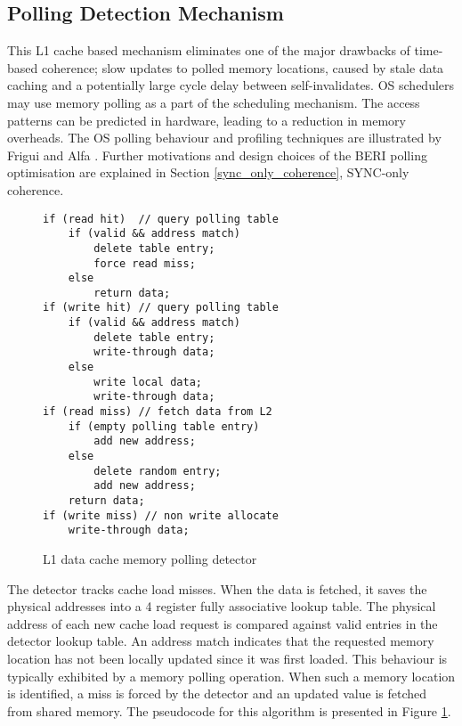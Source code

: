 	\subsection{Polling Detection Mechanism}
		\label{polling_detection_mechanism}
		This L1 cache based mechanism eliminates one of the major drawbacks of time-based coherence; slow updates to polled memory locations, caused by stale data caching and a potentially large cycle delay between self-invalidates. OS schedulers may use memory polling as a part of the scheduling mechanism. The access patterns can be predicted in hardware, leading to a reduction in memory overheads. The OS polling behaviour and profiling techniques are illustrated by Frigui and Alfa \cite{Frigui95}.  Further motivations and design choices of the BERI polling optimisation are explained in Section \ref{sync_only_coherence}, SYNC-only coherence. 

		\begin{figure}[!t]
		\begin{tcolorbox}[
		colback=cyan!1!white,
		colframe=cyan!75!black]
\begin{center}
\begin{BVerbatim}
if (read hit)  // query polling table
	if (valid && address match)
		delete table entry;
		force read miss;
	else
		return data;
if (write hit) // query polling table
	if (valid && address match)
		delete table entry;
		write-through data;
	else
		write local data;
		write-through data;	
if (read miss) // fetch data from L2
	if (empty polling table entry)
		add new address;
	else
		delete random entry;
		add new address;
	return data;
if (write miss) // non write allocate
	write-through data;
\end{BVerbatim}
\end{center}		
		\end{tcolorbox}
		\caption{L1 data cache memory polling detector}
		\label{polling_detector_diagram}
		\end{figure}

		The detector tracks cache load misses. When the data is fetched, it saves the physical addresses into a 4 register fully associative lookup table. 
		The physical address of each new cache load request is compared against valid entries in the detector lookup table. 
		An address match indicates that the requested memory location has not been locally updated since it was first loaded. 
		This behaviour is typically exhibited by a memory polling operation. 
		When such a memory location is identified, a miss is forced by the detector and an updated value is fetched from shared memory. 
		The pseudocode for this algorithm is presented in Figure \ref{polling_detector_diagram}.
		
